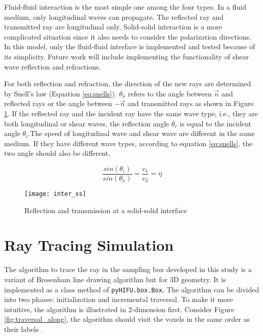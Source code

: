 Fluid-fluid interaction is the most simple one among the four types. In a fluid medium, only longitudinal waves can propagate. The reflected ray and transmitted ray are longitudinal only. Solid-solid interaction is a more complicated situation since it also needs to consider the polarization directions. In this model, only the fluid-fluid interface is implemented and tested because of its simplicity. Future work will include implementing the functionality of shear wave reflection and refractions.

For both reflection and refraction, the direction of the new rays are determined by Snell's law (Equation \ref{eq:snells}). $\theta_x$ refers to the angle between $\vec{n}$ and reflected rays or the angle between $-\vec{n}$ and transmitted rays as shown in Figure \ref{fig:inter_ss}. If the reflected ray and the incident ray have the same wave type, i.e., they are both longitudinal or shear waves, the reflection angle $\theta_{r}$ is equal to the incident angle $\theta_i$.The speed of longitudinal wave and shear wave are different in the same medium. If they have different wave types, according to equation \ref{eq:snells}, the two angle should also be different.

\begin{equation} \label{eq:snells}
    \frac{sin(\theta_i)}{sin(\theta_{x})} = \frac{c_1}{c_2}=\eta
\end{equation}

\begin{figure}[h]
    \centering
    \texttt{[image: inter\_ss]}
    \caption{Reflection and transmission at a solid-solid interface}
    \label{fig:inter_ss}
\end{figure}

\section{Ray Tracing Simulation} \label{sec:ray_tracing}

The algorithm to trace the ray in the sampling box developed in this study is a variant of Bresenham line drawing algorithm \cite{bresenham} but for 3D geometry. It is implemented as a class method of \texttt{pyHIFU.box.Box}. The algorithm can be divided into two phases: initialization and incremental traversal. To make it more intuitive, the algorithm is illustrated in 2-dimension first. Consider Figure \ref{fig:traversal_along}, the algorithm should visit the voxels in the same order as their labels \cite{wooraytracing}.

